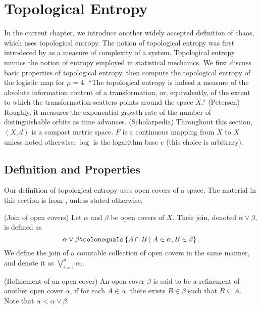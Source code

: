 \documentclass[12pt,twoside,draft]{book}
\begin{document}
\chapter{Topological Entropy}
In the current chapter, we introduce another widely accepted definition of chaos, which uses topological entropy.
The notion of topological entropy was first introdeced by \citet{akm} as a measure of complexity of a system.
Topological entropy mimics the notion of entropy employed in statistical mechanics.
We first discuss basic properties of topological entropy, then compute the topological entropy of the logistic map for $\mu = 4$.
``The topological entropy is indeed a measure of the absolute information content of a transformation, or, equivalently, of the extent to which the transformation scatters points around the space $X$.'' (Petersen)
Roughly, it measures the exponential growth rate of the number of distinguishable orbits as time advances. (Scholarpedia)
Throughout this section, $(X,d)$ is a compact metric space.
$F$ is a continuous mapping from $X$ to $X$ unless noted otherwise.
$\log$ is the logarithm base $e$ (this choice is arbitrary).

\section{Definition and Properties}
Our definition of topological entropy uses open covers of a space. 
The material in this section is from \citep{akm}, unless stated otherwise.
\begin{definition}
  (Join of open covers)
  Let $\alpha$ and $\beta$ be open covers of $X$.
  Their join, denoted $\alpha \vee \beta$, is defined as
  \begin{equation*}
    \alpha \vee \beta \ceq \setst{A \cap B}{A \in \alpha, B \in \beta}.
  \end{equation*}
  We define the join of a countable collection of open covers in the same manner, and denote it as $\bigvee\limits_{i = 1}^{n} \alpha_i$.
\end{definition}
\begin{definition}
  (Refinement of an open cover)
  An open cover $\beta$ is said to be a refinement of another open cover $\alpha$, if for each $A \in \alpha$, there exists $B \in \beta$ such that $B \subseteq A$.
  Note that $\alpha < \alpha \vee \beta$.
\end{definition}
\end{document}
